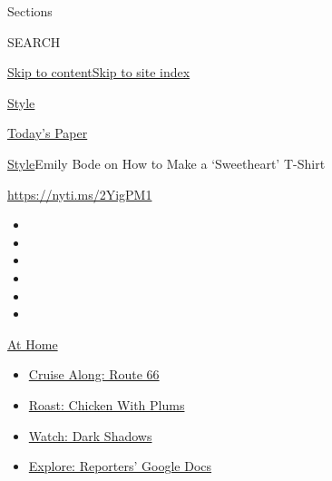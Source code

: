 Sections

SEARCH

\protect\hyperlink{site-content}{Skip to
content}\protect\hyperlink{site-index}{Skip to site index}

\href{https://www.nytimes3xbfgragh.onion/section/style}{Style}

\href{https://myaccount.nytimes3xbfgragh.onion/auth/login?response_type=cookie\&client_id=vi}{}

\href{https://www.nytimes3xbfgragh.onion/section/todayspaper}{Today's
Paper}

\href{/section/style}{Style}\textbar{}Emily Bode on How to Make a
`Sweetheart' T-Shirt

\url{https://nyti.ms/2YigPM1}

\begin{itemize}
\item
\item
\item
\item
\item
\item
\end{itemize}

\href{https://www.nytimes3xbfgragh.onion/spotlight/at-home?action=click\&pgtype=Article\&state=default\&region=TOP_BANNER\&context=at_home_menu}{At
Home}

\begin{itemize}
\tightlist
\item
  \href{https://www.nytimes3xbfgragh.onion/2020/09/07/travel/route-66.html?action=click\&pgtype=Article\&state=default\&region=TOP_BANNER\&context=at_home_menu}{Cruise
  Along: Route 66}
\item
  \href{https://www.nytimes3xbfgragh.onion/2020/09/04/dining/sheet-pan-chicken.html?action=click\&pgtype=Article\&state=default\&region=TOP_BANNER\&context=at_home_menu}{Roast:
  Chicken With Plums}
\item
  \href{https://www.nytimes3xbfgragh.onion/2020/09/04/arts/television/dark-shadows-stream.html?action=click\&pgtype=Article\&state=default\&region=TOP_BANNER\&context=at_home_menu}{Watch:
  Dark Shadows}
\item
  \href{https://www.nytimes3xbfgragh.onion/interactive/2020/at-home/even-more-reporters-editors-diaries-lists-recommendations.html?action=click\&pgtype=Article\&state=default\&region=TOP_BANNER\&context=at_home_menu}{Explore:
  Reporters' Google Docs}
\end{itemize}

